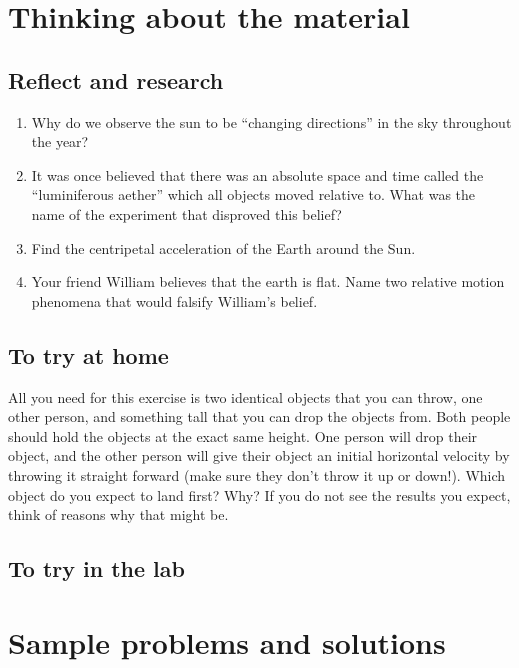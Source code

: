 \section{Thinking about the material}
\subsection{Reflect and research}

\begin{enumerate}
\item Why do we observe the sun to be ``changing directions'' in the sky throughout the year?
\item It was once believed that there was an absolute space and time called the ``luminiferous aether'' which all objects moved relative to. What was the name of the experiment that disproved this belief?
\item Find the centripetal acceleration of the Earth around the Sun.
\item Your friend William believes that the earth is flat. Name two relative motion phenomena that would falsify William's belief.
\end{enumerate}
\subsection{To try at home}

\begin{tQuestion}All you need for this exercise is two identical objects that you can throw, one other person, and something tall that you can drop the objects from. Both people should hold the objects at the exact same height. One person will drop their object, and the other person will give their object an initial horizontal velocity by throwing it straight forward (make sure they don't throw it up or down!). Which object do you expect to land first? Why? If you do not see the results you expect, think of reasons why that might be. \end{tQuestion}

\subsection{To try in the lab}

\newpage
\section{Sample problems and solutions}
